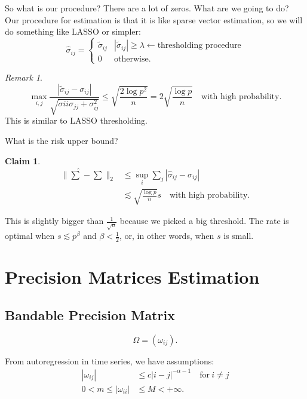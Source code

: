 \documentclass[twoside]{article}
\theoremstyle{definition}
\theoremstyle{definition}
\newtheorem*{claim}{Claim}
\theoremstyle{remark}
\newtheorem*{rem}{Remark}
\begin{document}
So what is our procedure? There are a lot of zeros. What are we going to do? Our procedure for estimation is that it is like sparse vector estimation, so we will do something like LASSO or simpler:
\[
\widehat \sigma_{ij} = \begin{cases}
\widetilde \sigma_{ij} & | \widetilde \sigma_{ij} | \geq \lambda \leftarrow \text{thresholding procedure}\\
0 & \text{otherwise}.
\end{cases}
\]

\begin{rem}
\[
\max \limits_{i,j} \frac{| \widetilde \sigma_{ij} - \sigma_{ij} |}{\sqrt{\sigma{ii} \sigma_{jj} + \sigma_{ij}^2}} \leq \sqrt{\frac{2 \log p^2}{n}} = 2 \sqrt{\frac{\log p}{n}} \quad \text{with high probability}.
\]
This is similar to LASSO thresholding.
\end{rem}

What is the risk upper bound?

\begin{claim}
\[
\begin{aligned}
\| \widehat \sum - \sum \|_2 &\leq \sup \limits_i \sum \limits_j | \widehat \sigma_{ij} - \sigma_{ij} | \\
&\lesssim \sqrt{\frac{\log p}{n}} s \quad \text{with high probability}.
\end{aligned}
\]
\end{claim}

This is slightly bigger than $\frac{1}{\sqrt{n}}$ because we picked a big threshold. The rate is optimal when $s \lesssim p^\beta$ and $\beta < \frac{1}{2}$, or, in other words, when $s$ is small.

\section{Precision Matrices Estimation}

\subsection{Bandable Precision Matrix}

\[
\Omega = (\omega_{ij}).
\]

From autoregression in time series, we have assumptions:
\[
\begin{aligned}
| \omega_{ij} | &\leq c |i-j|^{-\alpha - 1} \quad \text{for} \ i \ne j \\
0 < m \leq | \omega_{ii} | &\leq M < + \infty.
\end{aligned}
\]
\end{document}
